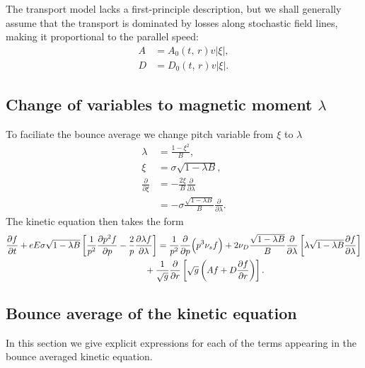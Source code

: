 \documentclass[11pt,a4paper]{article}
\begin{document}
The transport model lacks a first-principle description, but we shall generally assume that the transport is dominated by losses along stochastic field lines, making it proportional to the parallel speed:
\begin{align}
A &= A_0(t,\,r)v |\xi|, \nonumber \\
D &= D_0(t,\,r) v|\xi|.
\end{align}

\subsection{Change of variables to magnetic moment $\lambda$}
To faciliate the bounce average we change pitch variable from $\xi$ to $\lambda$
\begin{align}
\lambda &= \frac{1-\xi^2}{B}, \nonumber \\
\xi &= \sigma\sqrt{1-\lambda B}, \nonumber \\
\frac{\partial}{\partial \xi} &= -\frac{2\xi}{B}\frac{\partial}{\partial \lambda} \nonumber \\
&= -\sigma\frac{\sqrt{1-\lambda B}}{B}\frac{\partial}{\partial \lambda} .
\end{align}
The kinetic equation then takes the form
\begin{align}
\frac{\partial f}{\partial t} + eE \sigma\sqrt{1-\lambda B}\left[\frac{1}{p^2}\frac{\partial p^2 f}{\partial p}  - \frac{2}{p}\frac{\partial \lambda f}{\partial \lambda}\right] &= \frac{1}{p^2}\frac{\partial}{\partial p}\Big(p^3 \nu_s  f\Big) + 2\nu_D\frac{\sqrt{1-\lambda B}}{B}\frac{\partial}{\partial \lambda}\left[\lambda \sqrt{1-\lambda B}\frac{\partial f}{\partial \lambda}\right] \nonumber \\
&\hspace{-5mm} + \frac{1}{\sqrt{g}}\frac{\partial}{\partial r}\left[ \sqrt{g}\left( Af+D\frac{\partial f}{\partial r}\right)\right].
\end{align}
 
\subsection{Bounce average of the kinetic equation}
In this section we give explicit expressions for each of the terms appearing in the bounce averaged kinetic equation.
\end{document}

